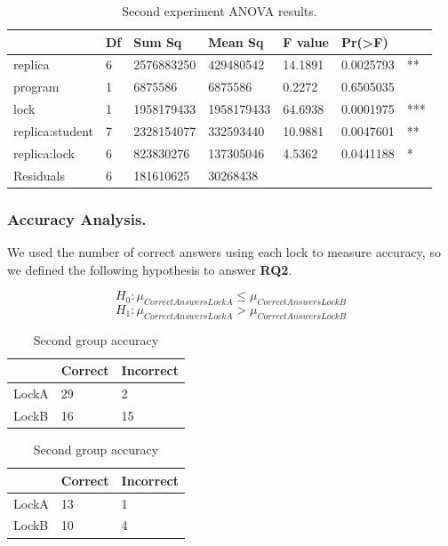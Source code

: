 \begin{table}%
\begin{center}
\caption{Second experiment ANOVA results.}\label{tab:unova2}
\begin{tabular}{|l|l|l|l|l|ll|}
\hline
                 & Df &    Sum Sq &   Mean Sq  & F value &   Pr(>F) & \\   
\hline
replica          & 6 & 2576883250 &  429480542 & 14.1891 & 0.0025793 & **  \\
program          & 1 &    6875586 &    6875586 &  0.2272 & 0.6505035 &     \\
lock             & 1 & 1958179433 & 1958179433 & 64.6938 & 0.0001975 & *** \\
replica:student  & 7 & 2328154077 &  332593440 & 10.9881 & 0.0047601 & **  \\
replica:lock     & 6 &  823830276 &  137305046 &  4.5362 & 0.0441188 & *   \\
Residuals        & 6 &  181610625 &   30268438 &         &           &     \\
\hline
\end{tabular}
\end{center}
\end{table}

\subsubsection{Accuracy Analysis.}

We used the number of correct answers using each lock to measure accuracy, so we defined the following hypothesis to answer {\bf RQ2}. 

\begin{equation}
  H_{0} : \mu_{CorrectAnswersLockA} \leq \mu_{CorrectAnswersLockB}
\end{equation}
\begin{equation}
  H_{1} : \mu_{CorrectAnswersLockA} > \mu_{CorrectAnswersLockB}
\end{equation}

\begin{table}
\parbox{.45\linewidth}{
\centering
\begin{tabular}{|l|l|l|}
\hline
 & Correct & Incorrect\\
\hline
LockA & 29 & 2\\
LockB & 16 & 15\\
\hline
\end{tabular}
\caption{First group accuracy}\label{tab:accuracy1}
}
\hfill
\parbox{.45\linewidth}{
\centering
\begin{tabular}{|l|l|l|}
\hline
 & Correct & Incorrect\\
\hline
LockA & 13 & 1\\
LockB & 10 & 4\\
\hline
\end{tabular}
\caption{Second group accuracy}\label{tab:accuracy2}
}
\end{table}

